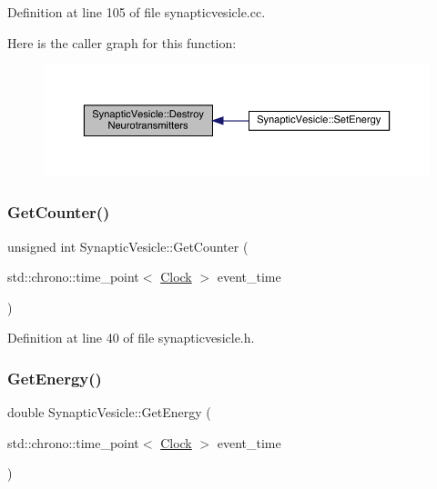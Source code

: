 Definition at line 105 of file synapticvesicle.\+cc.

Here is the caller graph for this function\+:\nopagebreak
\begin{figure}[H]
\begin{center}
\leavevmode
\includegraphics[width=350pt]{class_synaptic_vesicle_a37817cc68b212d89ef8aa08c73631cbb_icgraph}
\end{center}
\end{figure}
\mbox{\label{class_synaptic_vesicle_a42a3ab6704c27ca55531864c46f0fc2b}} 
\subsubsection{\texorpdfstring{Get\+Counter()}{GetCounter()}}
{\footnotesize\ttfamily unsigned int Synaptic\+Vesicle\+::\+Get\+Counter (\begin{DoxyParamCaption}\item[{std\+::chrono\+::time\+\_\+point$<$ \hyperlink{universe_8h_a0ef8d951d1ca5ab3cfaf7ab4c7a6fd80}{Clock} $>$}]{event\+\_\+time }\end{DoxyParamCaption})\hspace{0.3cm}{\ttfamily [inline]}}



Definition at line 40 of file synapticvesicle.\+h.

\mbox{\label{class_synaptic_vesicle_a0c4d7e936023cf0f719d0a4d3f315c9c}} 
\subsubsection{\texorpdfstring{Get\+Energy()}{GetEnergy()}}
{\footnotesize\ttfamily double Synaptic\+Vesicle\+::\+Get\+Energy (\begin{DoxyParamCaption}\item[{std\+::chrono\+::time\+\_\+point$<$ \hyperlink{universe_8h_a0ef8d951d1ca5ab3cfaf7ab4c7a6fd80}{Clock} $>$}]{event\+\_\+time }\end{DoxyParamCaption})\hspace{0.3cm}{\ttfamily [inline]}}



